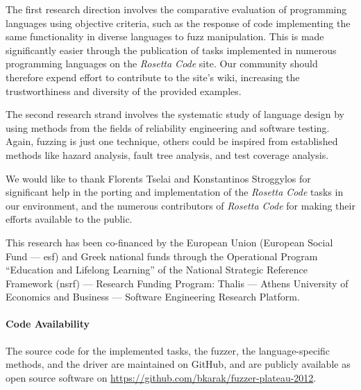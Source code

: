 \documentclass[10pt]{sigplanconf}
\begin{document}
The first research direction involves the comparative evaluation
of programming languages using objective criteria,
such as the response of code implementing the same functionality
in diverse languages to fuzz manipulation.
This is made significantly easier through the publication of
tasks implemented in numerous programming languages on the
{\em Rosetta Code} site.
Our community should therefore expend effort to contribute to
the site's wiki, increasing the trustworthiness and diversity of
the provided examples.

The second research strand involves the systematic study of
language design by using methods from the fields of reliability engineering
and software testing.
Again, fuzzing is just one technique, others could be inspired from
established methods like
hazard analysis,
fault tree analysis, and
test coverage analysis.

\acks

We would like to thank Florents Tselai and Konstantinos Stroggylos 
for significant help in the porting and implementation of the
{\em Rosetta Code} tasks in our environment,
and the numerous contributors of {\em Rosetta Code} for
making their efforts available to the public.

This research has been co-financed by
the European Union (European Social Fund --- {\sc esf})
and Greek national funds through the Operational Program
``Education and Lifelong Learning''
of the National Strategic Reference Framework ({\sc nsrf})
--- Research Funding Program:
Thalis ---
Athens University of Economics and Business ---
Software Engineering Research Platform.

\paragraph{Code Availability} The source code for
the implemented tasks,
the fuzzer,
the language-specific methods, and
the driver are maintained on GitHub, and
are publicly available as open source software on \url{https://github.com/bkarak/fuzzer-plateau-2012}.









\end{document}

